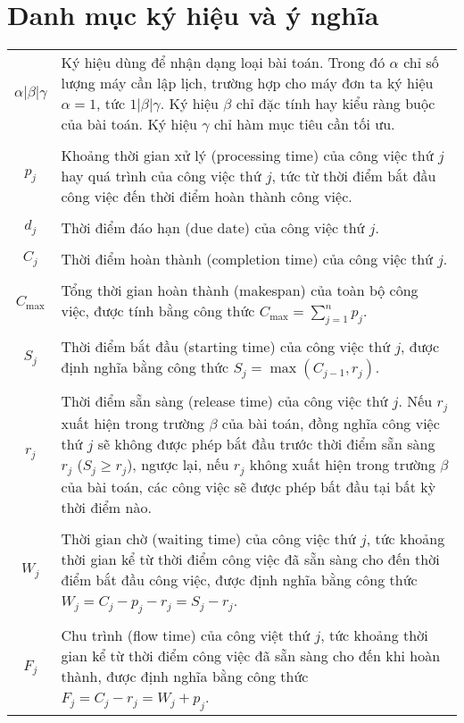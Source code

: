 \documentclass[12pt,a4paper]{report}
\begin{document}
	\chapter*{Danh mục ký hiệu và ý nghĩa}
	\thispagestyle{fancy}
	\begin{tabularx}{\linewidth}{ c  X }
		$\alpha | \beta | \gamma$ & Ký hiệu dùng để nhận dạng loại bài toán. Trong đó $\alpha$ chỉ số lượng máy cần lập lịch, trường hợp cho máy đơn ta ký hiệu $\alpha = 1$, tức $1| \beta | \gamma$. Ký hiệu $\beta$ chỉ đặc tính hay kiểu ràng buộc của bài toán. Ký hiệu $\gamma$ chỉ hàm mục tiêu cần tối ưu. \\
		\\
		$p_j$ & Khoảng thời gian xử lý (processing time) của công việc thứ $j$ hay quá trình của công việc thứ $j$, tức từ thời điểm bắt đầu công việc đến thời điểm hoàn thành công việc. \\
		\\
		$d_j$ & Thời điểm đáo hạn (due date) của công việc thứ $j$. \\
		\\
		$C_j$ & Thời điểm hoàn thành (completion time) của công việc thứ $j$. \\
		\\
		$C_{\max}$ & Tổng thời gian hoàn thành (makespan) của toàn bộ công việc, được tính bằng công thức $C_{\max} = \sum_{j=1}^n p_j$. \\
		\\
		$S_j$ & Thời điểm bắt đầu (starting time) của công việc thứ $j$, được định nghĩa bằng công thức $S_j = \max (C_{j-1}, r_j)$. \\
		\\
		$r_j$ & Thời điểm sẵn sàng (release time) của công việc thứ $j$. Nếu $r_j$ xuất hiện trong trường $\beta$ của bài toán, đồng nghĩa công việc thứ $j$ sẽ không được phép bắt đầu trước thời điểm sẵn sàng $r_j$ ($S_j \geq r_j$), ngược lại, nếu $r_j$ không xuất hiện trong trường $\beta$ của bài toán, các công việc sẽ được phép bất đầu tại bất kỳ thời điểm nào. \\
		\\
		$W_j$ & Thời gian chờ (waiting time) của công việc thứ $j$, tức khoảng thời gian kể từ thời điểm công việc đã sẵn sàng cho đến thời điểm bắt đầu công việc, được định nghĩa bằng công thức $W_j = C_j - p_j - r_j = S_j - r_j$. \\
		\\
		$F_j$ & Chu trình (flow time) của công việt thứ $j$, tức khoảng thời gian kể từ thời điểm công việc đã sẵn sàng cho đến khi hoàn thành, được định nghĩa bằng công thức $F_j = C_j - r_j = W_j + p_j$. \\

\end{tabularx}
\end{document}
